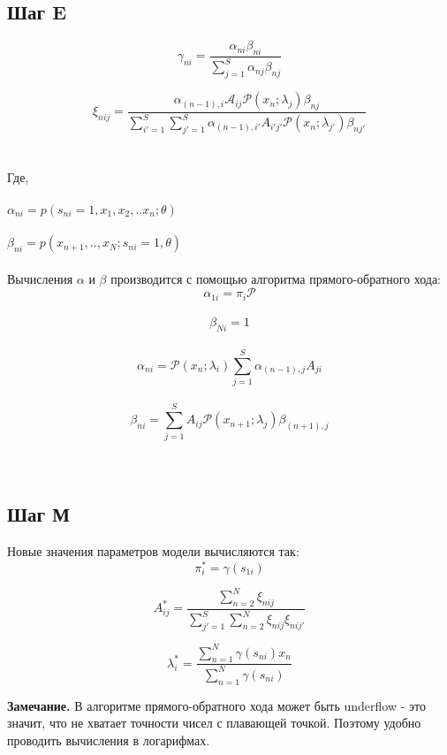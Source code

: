 \documentclass{matmex-diploma}
\begin{document}
\subsection*{Шаг E}
\begin{equation}\gamma_{ni}=\frac{\alpha_{ni}\beta_{ni}}{\sum_{j=1}^S\alpha_{nj}\beta_{nj}}\end{equation}

\begin{equation}\xi_{nij}=\frac{\alpha_{(n-1),i}\mathcal{A}_{ij}\mathcal{P}(x_n;\lambda_j)\beta_{nj}}{\sum_{i'=1}^S\sum_{j'=1}^S\alpha_{(n-1),i'}A_{i'j'}\mathcal{P}(x_n;\lambda_{j'})\beta_{nj'}}\end{equation}
\\\\
Где, 
\\\\
$\alpha_{ni}=p(s_{ni}=1,x_1,x_2,..x_n;\theta)$
\\\\
$\beta_{ni}=p(x_{n+1}, ..,x_N; s_{ni}=1,\theta)$
\\\\
Вычисления $\alpha$ и $\beta$ производится с помощью алгоритма прямого-обратного хода:
\\
$$\alpha_{1i}=\pi_i\mathcal{P}$$
\\
$$\beta_{Ni}=1$$
\\
$$\alpha_{ni}=\mathcal{P}(x_n;\lambda_i)\sum_{j=1}^S\alpha_{(n-1),j}A_{ji}$$
\\
$$\beta_{ni}=\sum_{j=1}^S A_{ij}\mathcal{P}(x_{n+1};\lambda_j)\beta_{(n+1),j}$$
\\\\
\subsection*{Шаг М}
Новые значения параметров модели вычисляются так:
\begin{equation}\pi_i^*=\gamma(s_{1i})\end{equation}

\begin{equation}A_{ij}^*=\frac{\sum_{n=2}^N\xi_{nij}}{\sum_{j'=1}^S\sum_{n=2}^N\xi_{nij}\xi_{nij'}}\end{equation}

\begin{equation}\lambda_i^* = \frac{\sum_{n=1}^N\gamma(s_{ni})x_n}{\sum_{n=1}^N\gamma(s_{ni})}\end{equation}

\textbf{Замечание.} В алгоритме прямого-обратного хода может быть underflow - это значит, что не хватает точности чисел с плавающей точкой.
Поэтому удобно проводить вычисления в логарифмах.
\end{document}

